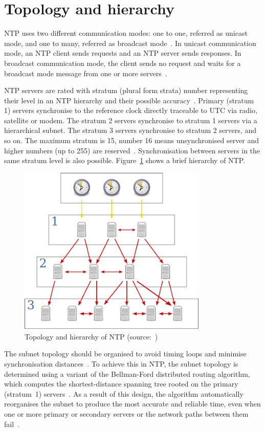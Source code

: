 
\section{Topology and hierarchy}\label{sec:ntp-topology}
NTP uses two different communication modes:
one to one, referred as unicast mode, and one to many, referred as broadcast mode~\cite{rfc5905}.
In unicast communication mode, an NTP client sends requests and an NTP server sends responses.
In broadcast communication mode, the client sends no request
and waits for a broadcast mode message from one or more servers~\cite{rfc5905}.

NTP servers are rated with stratum (plural form strata) number representing their level
in an NTP hierarchy and their possible accuracy~\cite{rfc5905}.
Primary (stratum 1) servers synchronise to the reference clock directly traceable to UTC via
radio, satellite or modem.
The stratum 2 servers synchronise to stratum 1
servers via a hierarchical subnet.
The stratum 3 servers synchronise to stratum 2 servers, and so on.
The maximum stratum is 15, number 16 means unsynchronised server
and higher numbers (up to 255) are reserved~\cite{rfc5905}.
Synchronisation between servers in the same stratum level is also possible.
Figure~\ref{fig:ntp-hierarchy} shows a brief hierarchy of NTP.
\begin{figure}
  \centering
  \includegraphics[width=9cm,keepaspectratio]{fig/Network_Time_Protocol_servers_and_clients.pdf}
  \caption{Topology and hierarchy of NTP (source:~\cite{wikimedia-ntp})}
  \label{fig:ntp-hierarchy}
\end{figure}
The subnet topology should be organised to avoid timing loops
and minimise synchronisation distances~\cite{rfc5905}.
To achieve this in NTP, the subnet topology is determined using a variant
of the Bellman-Ford distributed routing algorithm, which computes
the shortest-distance spanning tree rooted on the primary (stratum~1) servers~\cite{rfc5905}.
As a result of this design, the
algorithm automatically reorganises the subnet to produce the most accurate and reliable time,
even when one or more primary or secondary servers or the network paths between them fail~\cite{rfc5905}.
